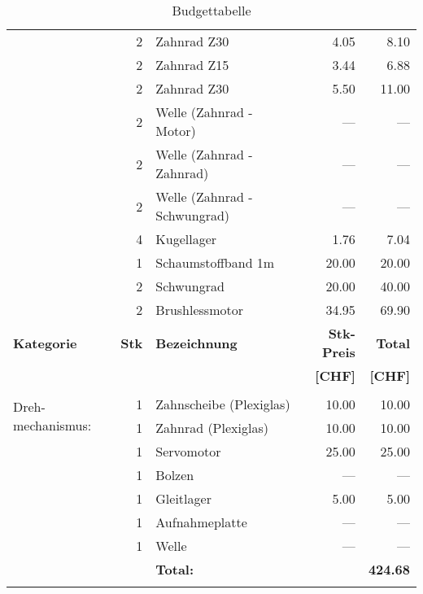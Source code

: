 \begin{longtable}{p{1.7cm}rlrr}
               & 2     & Zahnrad Z30                  &   4.05 &   8.10 \\
               & 2     & Zahnrad Z15                  &   3.44 &   6.88 \\
               & 2     & Zahnrad Z30                  &   5.50 &  11.00 \\
               & 2     & Welle (Zahnrad - Motor)      &  {---} &  {---} \\
               & 2     & Welle (Zahnrad - Zahnrad)    &  {---} &  {---} \\
               & 2     & Welle (Zahnrad - Schwungrad) &  {---} &  {---} \\
               & 4     & Kugellager                   &   1.76 &   7.04 \\
               & 1     & Schaumstoffband 1m           &  20.00 &  20.00 \\
               & 2     & Schwungrad                   &  20.00 &  40.00 \\
               & 2     & Brushlessmotor               &  34.95 &  69.90 \\
    \newpage    
    \textbf{Kategorie} & \textbf{Stk} & \textbf{Bezeichnung} & \textbf{Stk-Preis}
    & \textbf{Total} \\ & & & \textbf{[CHF]} & \textbf{[CHF]} \\ 
    \hline     &       &                              &        &        \\
    \multirow{2}{1.7cm}{Dreh-mechanismus:} 
               & 1     & Zahnscheibe (Plexiglas)      &  10.00 &  10.00 \\
               & 1     & Zahnrad (Plexiglas)          &  10.00 &  10.00 \\
               & 1     & Servomotor                   &  25.00 &  25.00 \\
               & 1     & Bolzen                       &  {---} &  {---} \\
               & 1     & Gleitlager                   &   5.00 &   5.00 \\
               & 1     & Aufnahmeplatte               &  {---} &  {---} \\
               & 1     & Welle                        &  {---} &  {---} \\
               &       & \textbf{Total:} &            & \textbf{424.68} \\
       \caption{Budgettabelle}
       \label{tab:Kostentabelle}
    \end{longtable}
